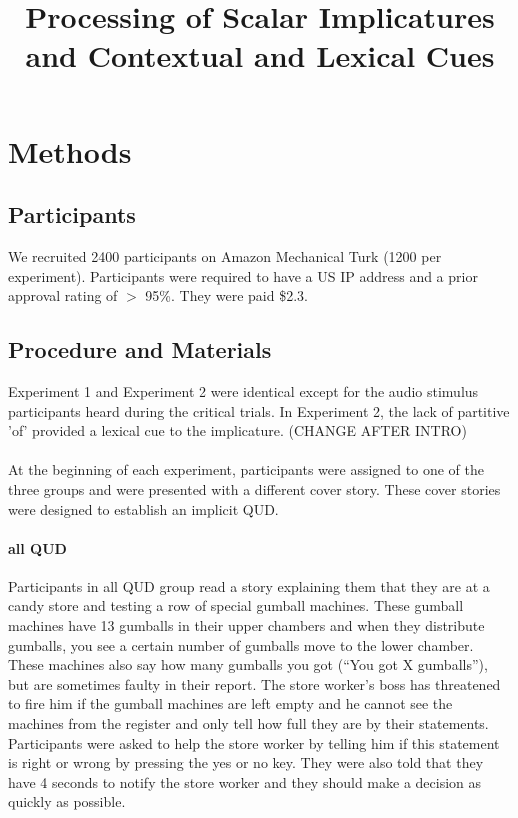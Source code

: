 \documentclass[12pt]{article}
\title{Processing of Scalar Implicatures and Contextual and Lexical Cues}
\author{}
\date{}
\begin{document}
 
\maketitle 

\section{Methods}
\subsection*{Participants}
We recruited 2400 participants on Amazon Mechanical Turk (1200 per experiment). Participants were required to have a US IP address and a prior approval rating of $>$ 95\%. They were paid \$2.3.

\subsection*{Procedure and Materials}
Experiment 1 and Experiment 2 were identical except for the audio stimulus participants heard during the critical trials. In Experiment 2, the lack of partitive 'of' provided a lexical cue to the implicature. (CHANGE AFTER INTRO)

\paragraph{} At the beginning of each experiment, participants were assigned to one of the three groups and were presented with a different cover story. These cover stories were designed to establish an implicit QUD.

\paragraph{all QUD} Participants in all QUD group read a story explaining them that they are at a candy store and testing a row of special gumball machines. These gumball machines have 13 gumballs in their upper chambers and when they distribute gumballs, you see a certain number of gumballs move to the lower chamber. These machines also say how many gumballs you got (“You got X gumballs”), but are sometimes faulty in their report. The store worker’s boss has threatened to fire him if the gumball machines are left empty and he cannot see the machines from the register and only tell how full they are by their statements. Participants were asked to help the store worker by telling him if this statement is right or wrong by pressing the yes or no key. They were also told that they have 4 seconds to notify the store worker and they should make a decision as quickly as possible.
\end{document}
